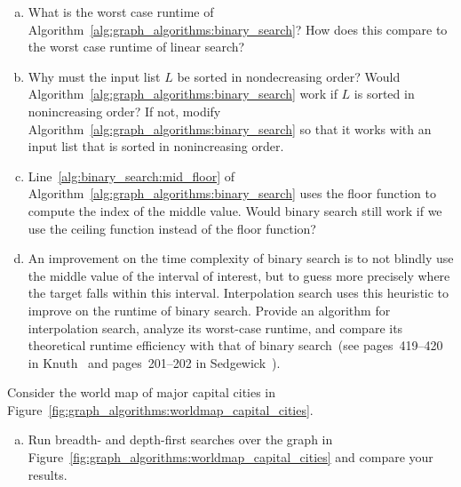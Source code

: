 \begin{problem}
\begin{enumerate}[(a)]
  \item What is the worst case runtime of
    Algorithm~\ref{alg:graph_algorithms:binary_search}? How does this
    compare to the worst case runtime of linear search?

  \item Why must the input list $L$ be sorted in nondecreasing order?
    Would Algorithm~\ref{alg:graph_algorithms:binary_search} work if
    $L$ is sorted in nonincreasing order? If not, modify
    Algorithm~\ref{alg:graph_algorithms:binary_search} so that it
    works with an input list that is sorted in nonincreasing order.

  \item Line~\ref{alg:binary_search:mid_floor} of
    Algorithm~\ref{alg:graph_algorithms:binary_search} uses the floor
    function to compute the index of the middle value. Would binary
    search still work if we use the ceiling function instead of the
    floor function?

  \item An improvement on the time complexity of binary search is to
    not blindly use the middle value of the interval of interest, but
    to guess more precisely where the target falls within this
    interval. Interpolation search uses this heuristic to improve on
    the runtime of binary search. Provide an algorithm for
    interpolation search, analyze its worst-case runtime, and compare
    its theoretical runtime efficiency with that of binary search~(see
    pages~419--420 in Knuth~\cite{Knuth1998} and pages~201--202 in
    Sedgewick~\cite{Sedgewick1990}).
  \end{enumerate}

\item Consider the world map of major capital cities in
  Figure~\ref{fig:graph_algorithms:worldmap_capital_cities}.
  \begin{enumerate}[(a)]
  \item Run breadth- and
    depth-first searches over the graph in
    Figure~\ref{fig:graph_algorithms:worldmap_capital_cities} and
    compare your results.


\end{enumerate}
\end{problem}
